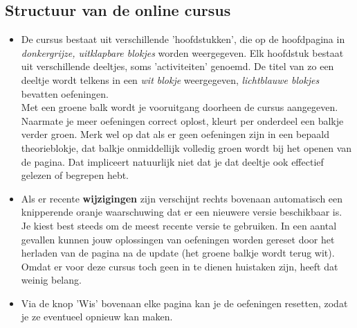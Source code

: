 \documentclass{ximera}
\begin{document}
 




 
 
\begin{onlineOnly}
\section*{Structuur van de online cursus}
 
\begin{itemize}
    \item De cursus bestaat uit verschillende 'hoofdstukken', die op de hoofdpagina in \textit{donkergrijze, uitklapbare blokjes} worden weergegeven. Elk hoofdstuk bestaat uit verschillende deeltjes, soms 'activiteiten' genoemd. De titel van zo een deeltje wordt telkens in een \textit{wit blokje} weergegeven,  \textit{lichtblauwe blokjes} bevatten oefeningen.
    \\
    Met een groene balk wordt je vooruitgang doorheen de cursus aangegeven. Naarmate je meer oefeningen correct oplost, kleurt per onderdeel een balkje verder groen.
    Merk wel op dat als er geen oefeningen zijn in een bepaald theorieblokje, dat balkje onmiddellijk volledig groen wordt bij het openen van de pagina. Dat impliceert natuurlijk niet dat je dat deeltje ook effectief gelezen of begrepen hebt.
     
    \item Als er recente \textbf{wijzigingen} zijn verschijnt rechts bovenaan automatisch een knipperende oranje waarschuwing dat er een nieuwere versie beschikbaar is. Je kiest best steeds om de meest recente versie te gebruiken. In een aantal gevallen kunnen jouw oplossingen van oefeningen worden gereset door het herladen van de pagina na de update (het groene balkje wordt terug wit). Omdat er voor deze cursus toch geen in te dienen huistaken zijn, heeft dat weinig belang.
     
    \item Via de knop 'Wis' bovenaan elke pagina kan je de oefeningen resetten, zodat je ze eventueel opnieuw kan maken.
     
 

\end{itemize}
\end{onlineOnly}
\end{document}
